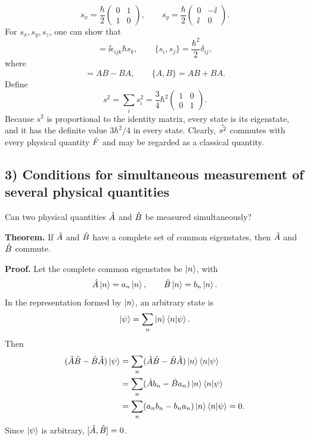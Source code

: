 \begin{equation}
s_x=\frac\hbar2\begin{pmatrix}0&1\\1&0\end{pmatrix},\qquad
s_y=\frac\hbar2\begin{pmatrix}0&-\ii\\\ii&0\end{pmatrix}.
\end{equation}
For $s_x,s_y,s_z$, one can show that
\begin{equation}
 [s_i,s_j]=\ii\epsilon_{ijk}\hbar s_k,\qquad
\{s_i,s_j\}=\frac{\hbar^2}{2}\delta_{ij},
\end{equation}
where
\begin{equation}
[A,B]=AB-BA,\qquad\{A,B\}=AB+BA.
\end{equation}
Define
\begin{equation}
s^2=\sum_i s_i^2=\frac{3}{4}\hbar^2\begin{pmatrix}1&0\\0&1\end{pmatrix}.
\end{equation}
Because $s^2$ is proportional to the identity matrix, every state is its eigenstate, and it has the definite value $3\hbar^2/4$ in every state. Clearly, $\hat{s^2}$ commutes with every physical quantity $\hat{F}$ and may be regarded as a classical quantity.
\subsection*{3) Conditions for simultaneous measurement of several physical quantities}
Can two physical quantities $\hat{A}$ and $\hat{B}$ be measured simultaneously?

\textbf{Theorem.} If $\hat{A}$ and $\hat{B}$ have a complete set of common eigenstates, then $\hat{A}$ and $\hat{B}$ commute.

\textbf{Proof.} Let the complete common eigenstates be $\left|n\right\rangle$, with
\begin{equation}
\hat{A}\left|n\right\rangle=a_n\left|n\right\rangle,\qquad \hat{B}\left|n\right\rangle=b_n\left|n\right\rangle.
\end{equation}
In the representation formed by $\left|n\right\rangle$, an arbitrary state is
\begin{equation}
\left|\psi\right\rangle=\sum_n\left|n\right\rangle\left\langle n\middle|\psi\right\rangle.
\end{equation}
Then
\begin{equation}\begin{aligned}
(\hat{A}\hat{B}-\hat{B}\hat{A})\left|\psi\right\rangle
&=\sum_n(\hat{A}\hat{B}-\hat{B}\hat{A})\left|n\right\rangle\left\langle n\middle|\psi\right\rangle\\
&=\sum_n(\hat{A} b_n-\hat{B} a_n)\left|n\right\rangle\left\langle n\middle|\psi\right\rangle\\
&=\sum_n(a_nb_n-b_na_n)\left|n\right\rangle\left\langle n\middle|\psi\right\rangle=0.
\end{aligned}\end{equation}
Since $\left|\psi\right\rangle$ is arbitrary, $[\hat{A},\hat{B}]=0$.

